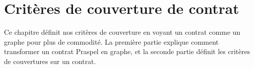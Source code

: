 \chapter{Critères de couverture de contrat}
\label{chapter:tests}

\minitoc

Ce chapitre définit nos critères de couverture en voyant un contrat comme un
graphe pour plus de commodité. La première partie explique comment transformer
un contrat Praspel en graphe, et la seconde partie définit les critères de
couvertures sur un contrat.

